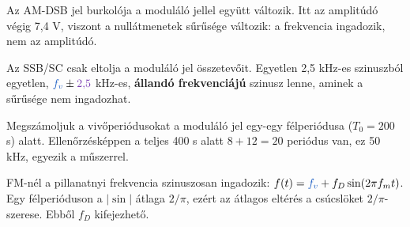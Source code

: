 Az AM-DSB jel burkolója a moduláló jellel együtt változik. Itt az amplitúdó végig 7,4 V, viszont a nullátmenetek sűrűsége változik: a frekvencia ingadozik, nem az amplitúdó.

Az SSB/SC csak eltolja a moduláló jel összetevőit. Egyetlen 2,5 kHz-es szinuszból egyetlen, ${\ca{f_v}}\pm{\cc{2{,}5}}$ kHz-es, \textbf{állandó frekvenciájú} szinusz lenne, aminek a sűrűsége nem ingadozhat.

Megszámoljuk a vivőperiódusokat a moduláló jel egy-egy félperiódusa ($T_0=200$ \textmu{}s) alatt. Ellenőrzésképpen a teljes 400 \textmu{}s alatt $8+12=20$ periódus van, ez 50 kHz, egyezik a műszerrel.

\begin{center}\end{center}

\begin{center}\end{center}

FM-nél a pillanatnyi frekvencia szinuszosan ingadozik: $f(t)={\ca{f_v}}+f_D\sin(2\pi f_mt)$. Egy félperióduson a $|\sin|$ átlaga $2/\pi$, ezért az átlagos eltérés a csúcslöket $2/\pi$-szerese. Ebből $f_D$ kifejezhető.

\begin{center}\end{center}

\begin{center}\end{center}

\begin{center}\end{center}

